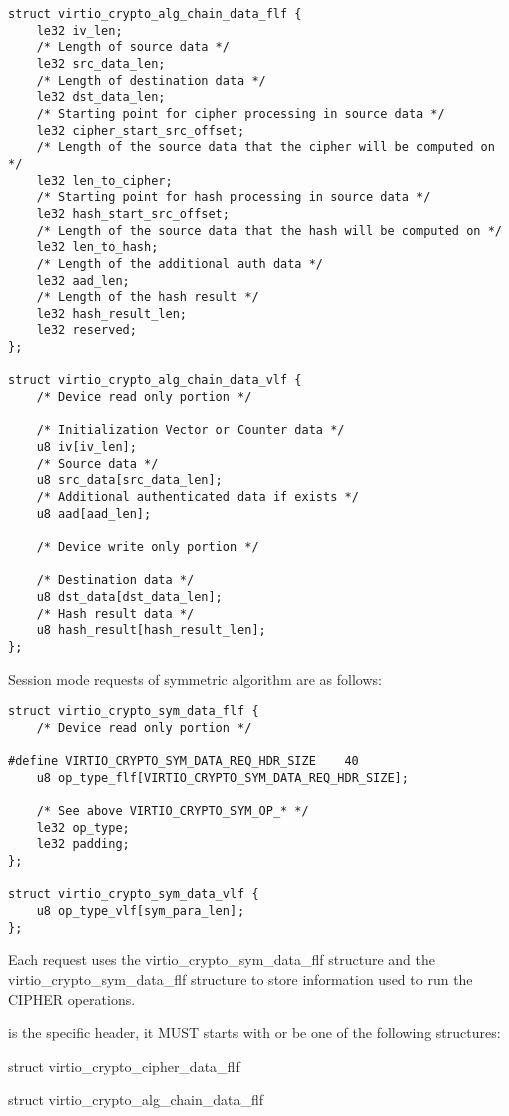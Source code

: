 \begin{lstlisting}
struct virtio_crypto_alg_chain_data_flf {
    le32 iv_len;
    /* Length of source data */
    le32 src_data_len;
    /* Length of destination data */
    le32 dst_data_len;
    /* Starting point for cipher processing in source data */
    le32 cipher_start_src_offset;
    /* Length of the source data that the cipher will be computed on */
    le32 len_to_cipher;
    /* Starting point for hash processing in source data */
    le32 hash_start_src_offset;
    /* Length of the source data that the hash will be computed on */
    le32 len_to_hash;
    /* Length of the additional auth data */
    le32 aad_len;
    /* Length of the hash result */
    le32 hash_result_len;
    le32 reserved;
};

struct virtio_crypto_alg_chain_data_vlf {
    /* Device read only portion */

    /* Initialization Vector or Counter data */
    u8 iv[iv_len];
    /* Source data */
    u8 src_data[src_data_len];
    /* Additional authenticated data if exists */
    u8 aad[aad_len];

    /* Device write only portion */

    /* Destination data */
    u8 dst_data[dst_data_len];
    /* Hash result data */
    u8 hash_result[hash_result_len];
};
\end{lstlisting}

Session mode requests of symmetric algorithm are as follows:

\begin{lstlisting}
struct virtio_crypto_sym_data_flf {
    /* Device read only portion */

#define VIRTIO_CRYPTO_SYM_DATA_REQ_HDR_SIZE    40
    u8 op_type_flf[VIRTIO_CRYPTO_SYM_DATA_REQ_HDR_SIZE];

    /* See above VIRTIO_CRYPTO_SYM_OP_* */
    le32 op_type;
    le32 padding;
};

struct virtio_crypto_sym_data_vlf {
    u8 op_type_vlf[sym_para_len];
};
\end{lstlisting}

Each request uses the virtio_crypto_sym_data_flf structure and the
virtio_crypto_sym_data_flf structure to store information used to run the
CIPHER operations.

 is the  specific header, it MUST starts
with or be one of the following structures:
\begin{itemize*}
\item struct virtio_crypto_cipher_data_flf
\item struct virtio_crypto_alg_chain_data_flf
\end{itemize*}


